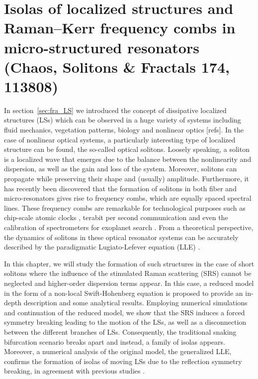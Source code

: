 \chapter{Isolas of localized structures and Raman–Kerr frequency combs in micro-structured resonators (Chaos, Solitons \& Fractals 174, 113808)}

In section~\ref{sec:fra_LS} we introduced the concept of dissipative 
localized structures (LSs) which can be observed in a huge variety
of systems including fluid mechanics, vegetation patterns, biology and 
nonlinear optics [refs]. In the case of nonlinear optical systems,
a particularly interesting type of localized structure can be found,
the so-called optical solitons. Loosely speaking, a soliton
is a localized wave that emerges due to the balance between the nonlinearity
and dispersion, as well as the gain and loss of the system. Moreover,
solitons can propagate while preserving their shape and (usually) amplitude.
Furthermore, it has recently been discovered that the formation of solitons
in both fiber and micro-resonators gives rise to frequency combs, which are equally
spaced spectral lines. These frequency combs are remarkable
for technological purposes such as chip-scale atomic clocks \cite{Jost2015clock}, terabit
per second communication \cite{marin2017microresonator} and even the calibration of spectrometers
for exoplanet search \cite{suh2019searching}. From a theoretical perspective, the dynamics
of solitons in these optical resonator systems can be accurately described 
by the paradigmatic Lugiato-Lefever equation (LLE) \cite{lugiatolefever1987}.

In this chapter, we will study the formation of such structures in the
case of short solitons where the influence of the stimulated Raman scattering (SRS)
cannot be neglected and higher-order dispersion terms appear. In this case, a reduced model
in the form of a non-local Swift-Hohenberg equation is proposed to provide an
in-depth description and some analytical results. Employing numerical simulations and
continuation of the reduced model, we show that the SRS induces a forced symmetry
breaking leading to the motion of the LSs, as well as a disconnection between the different
branches of LSs. Consequently, the traditional snaking bifurcation scenario breaks
apart and instead, a family of isolas appears. Moreover, a numerical analysis of the
original model, the generalized LLE, confirms the formation of isolas of moving LSs due
to the reflection symmetry breaking, in agreement with previous studies \cite{burke2009swift,parra2014third}.
